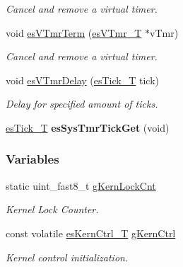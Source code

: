 \begin{DoxyCompactItemize}
\begin{DoxyCompactList}\small\item\em Cancel and remove a virtual timer. \end{DoxyCompactList}\item 
void \hyperlink{group__kern__impl_gad6ec93a68e3526f18ed926cd441878cd}{es\-V\-Tmr\-Term} (\hyperlink{group__kern__intf_ga3c020f0ca54ff412bc1d1505502d2afc}{es\-V\-Tmr\-\_\-\-T} $\ast$v\-Tmr)
\begin{DoxyCompactList}\small\item\em Cancel and remove a virtual timer. \end{DoxyCompactList}\item 
void \hyperlink{group__kern__impl_ga26d10c6aaa0cd1d04261d2c9911e890d}{es\-V\-Tmr\-Delay} (\hyperlink{group__kern__intf_ga844873888c186ee81eb66620dadb0451}{es\-Tick\-\_\-\-T} tick)
\begin{DoxyCompactList}\small\item\em Delay for specified amount of ticks. \end{DoxyCompactList}\item 
\hypertarget{group__kern__impl_gacb0d88d6a7e467dc37a6a9a85945aaa6}{\hyperlink{group__kern__intf_ga844873888c186ee81eb66620dadb0451}{es\-Tick\-\_\-\-T} {\bfseries es\-Sys\-Tmr\-Tick\-Get} (void)}\label{group__kern__impl_gacb0d88d6a7e467dc37a6a9a85945aaa6}

\end{DoxyCompactItemize}
\subsubsection*{Variables}
\begin{DoxyCompactItemize}
\item 
static uint\-\_\-fast8\-\_\-t \hyperlink{group__kern__impl_ga16a909b2eabeabadcfd3c8cd38437984}{g\-Kern\-Lock\-Cnt}
\begin{DoxyCompactList}\small\item\em Kernel Lock Counter. \end{DoxyCompactList}\item 
const volatile \hyperlink{group__kern__intf_gaae54a9918d92a2105b1d331b083d21b7}{es\-Kern\-Ctrl\-\_\-\-T} \hyperlink{group__kern__impl_ga299ac766f155bf1ef931627e2a0b895b}{g\-Kern\-Ctrl}
\begin{DoxyCompactList}\small\item\em Kernel control initialization. \end{DoxyCompactList}\end{DoxyCompactItemize}
